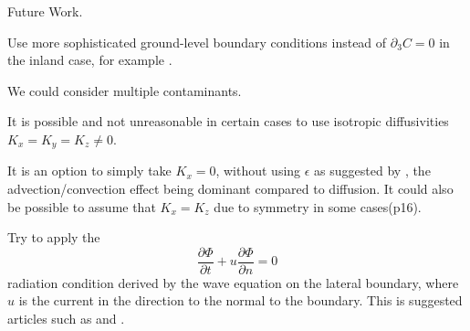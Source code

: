 Future Work.

  \item Use more sophisticated ground-level boundary conditions instead of $\partial_3 C = 0$ in the inland case, for example \cite{monin1959boundary}.
  
  \item We could consider multiple contaminants.
  
  \item It is possible and not unreasonable in certain cases to use isotropic diffusivities $K_x = K_y = K_z \neq 0$.
  
  \item It is an option to simply take $K_x = 0$, without using $\epsilon$ as suggested by \cite{hosseini2013}, the advection/convection effect being dominant compared to diffusion. It could also be possible to assume that $K_x = K_z$ due to symmetry in some cases(p16).
  
  \item Try to apply the
  \[ \frac{\partial \Phi}{\partial t} + u \frac{\partial \Phi}{\partial n} = 0 \]
  radiation condition derived by the wave equation on the lateral boundary, where $u$ is the current in the direction to the normal to the boundary. This is suggested articles such as \cite{marsaleix2006considerations} and \cite{wang2014ocean}.